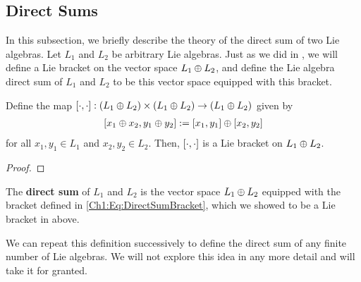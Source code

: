 
\subsection{Direct Sums}

In this subsection, we briefly describe the theory of the direct sum of two Lie algebras. Let $L_1$ and $L_2$ be arbitrary Lie algebras. Just as we did in , we will define a Lie bracket on the vector space $L_1 \oplus L_2$, and define the Lie algebra direct sum of $L_1$ and $L_2$ to be this vector space equipped with this bracket.

\begin{boxproposition}\label{Ch1:Prop:DirectSumLieBracket}
    Define the map $\left[ \cdot, \cdot \right] : \left( L_1 \oplus L_2 \right) \times \left( L_1 \oplus L_2 \right) \to \left( L_1 \oplus L_2 \right)$ given by
    \begin{align}
        \left[ x_1 \oplus x_2, y_1 \oplus y_2 \right] := \left[ x_1, y_1 \right] \oplus \left[ x_2, y_2 \right]
        \label{Ch1:Eq:DirectSumBracket}
    \end{align}
    for all $x_1, y_1 \in L_1$ and $x_2, y_2 \in L_2$. Then, $\left[ \cdot, \cdot \right]$ is a Lie bracket on $L_1 \oplus L_2$.
\end{boxproposition}
\begin{proof}
    \sorry
\end{proof}

\begin{boxdefinition}\label{Ch1:Def:DirectSum}
    The \textbf{direct sum} of $L_1$ and $L_2$ is the vector space $L_1 \oplus L_2$ equipped with the bracket defined in \eqref{Ch1:Eq:DirectSumBracket}, which we showed to be a Lie bracket in  above.
\end{boxdefinition}

We can repeat this definition successively to define the direct sum of any finite number of Lie algebras. We will not explore this idea in any more detail and will take it for granted.
